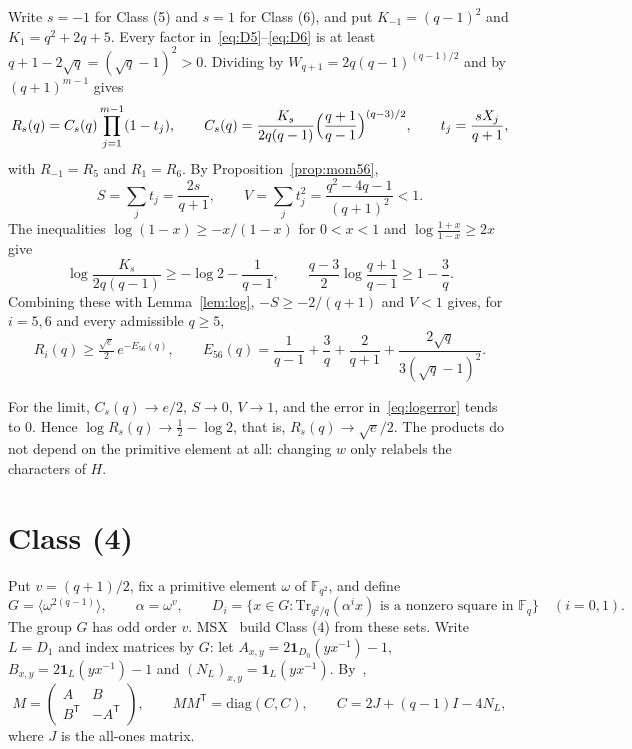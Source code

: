 \documentclass[11pt]{article}
\newcommand{\F}{\mathbb F}
\newcommand{\one}{\mathbf 1}
\newcommand{\Tr}{\mathrm{Tr}}
\newcommand{\Lstar}{\tfrac{\sqrt e}{2}}
\begin{document}
Write $s=-1$ for Class (5) and $s=1$ for Class (6), and put
$K_{-1}=(q-1)^2$ and $K_{1}=q^2+2q+5$. Every factor
in~\eqref{eq:D5}--\eqref{eq:D6} is at least $q+1-2\sqrt q=(\sqrt q-1)^2>0$.
Dividing by $W_{q+1}=2q(q-1)^{(q-1)/2}$ and by $(q+1)^{m-1}$ gives
\begin{equation}\label{eq:P56}
 R_{s}(q)=C_s(q)\prod_{j=1}^{m-1}(1-t_j),\qquad
 C_s(q)=\frac{K_s}{2q(q-1)}\Bigl(\frac{q+1}{q-1}\Bigr)^{(q-3)/2},\qquad
 t_j=\frac{sX_j}{q+1},
\end{equation}
with $R_{-1}=R_5$ and $R_1=R_6$. By Proposition~\ref{prop:mom56},
\[
 S=\sum_jt_j=\frac{2s}{q+1},\qquad V=\sum_jt_j^2=\frac{q^2-4q-1}{(q+1)^2}<1.
\]
The inequalities $\log(1-x)\ge-x/(1-x)$ for $0<x<1$ and
$\log\frac{1+x}{1-x}\ge2x$ give
\[
 \log\frac{K_s}{2q(q-1)}\ge-\log2-\frac1{q-1},\qquad
 \frac{q-3}{2}\log\frac{q+1}{q-1}\ge1-\frac3q .
\]
Combining these with Lemma~\ref{lem:log}, $-S\ge-2/(q+1)$ and $V<1$ gives,
for $i=5,6$ and every admissible $q\ge5$,
\begin{equation}\label{eq:E56}
 R_i(q)\ge\Lstar\,e^{-E_{56}(q)},\qquad
 E_{56}(q)=\frac1{q-1}+\frac3q+\frac2{q+1}+\frac{2\sqrt q}{3(\sqrt q-1)^2}.
\end{equation}

For the limit, $C_s(q)\to e/2$, $S\to0$, $V\to1$, and the error
in~\eqref{eq:logerror} tends to $0$. Hence $\log R_s(q)\to\frac12-\log2$,
that is, $R_s(q)\to\sqrt e/2$. The products do not depend on the primitive
element at all: changing $w$ only relabels the characters of $H$.

\section{Class (4)}\label{sec:4}

Put $v=(q+1)/2$, fix a primitive element $\omega$ of $\F_{q^2}$, and define
\[
 G=\langle\omega^{2(q-1)}\rangle,\qquad \alpha=\omega^v,\qquad
 D_i=\bigl\{x\in G:\Tr_{q^2/q}(\alpha^ix)\text{ is a nonzero square in }\F_q\bigr\}
 \quad(i=0,1).
\]
The group $G$ has odd order $v$. MSX~\cite[Theorem 3.4]{MSX} build Class (4)
from these sets. Write $L=D_1$ and index matrices by $G$: let
$A_{x,y}=2\one_{D_0}(yx^{-1})-1$, $B_{x,y}=2\one_L(yx^{-1})-1$ and
$(N_L)_{x,y}=\one_L(yx^{-1})$. By~\cite[Proposition 2.5]{MSX},
\begin{equation}\label{eq:gram4}
 M=\begin{pmatrix}A&B\\B^{\mathsf T}&-A^{\mathsf T}\end{pmatrix},
 \qquad MM^{\mathsf T}=\mathrm{diag}(C,C),
 \qquad C=2J+(q-1)I-4N_L,
\end{equation}
where $J$ is the all-ones matrix.
\end{document}
